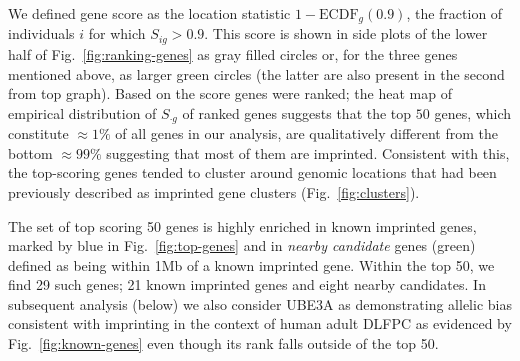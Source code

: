 \documentclass[12pt,letterpaper]{article}
\begin{document}
We defined gene score as
the location statistic \(1 - \mathrm{ECDF}_g(0.9)\), the fraction of
individuals \(i\) for which \(S_{ig}>0.9\).  This score is shown in side plots
of the lower half of Fig.~\ref{fig:ranking-genes} as gray filled circles or,
for the three genes mentioned above, as larger green circles (the latter are
also present in the second from top graph).  Based on the score genes were
ranked; the heat map of empirical distribution of \(S_{\cdot g}\) of ranked
genes suggests that the top \(50\) genes, which constitute \(\approx
1\%\) of all genes in our analysis, are qualitatively different from the
bottom \(\approx 99\%\) suggesting that most of them are imprinted.
Consistent with this, the top-scoring genes tended to cluster around genomic
locations that had been previously described as imprinted gene clusters
(Fig.~\ref{fig:clusters}).

The set of top scoring 50 genes is highly enriched in known imprinted genes,
marked by blue in Fig.~\ref{fig:top-genes} and in \emph{nearby candidate}
genes (green) defined as being within 1Mb of a known imprinted gene. Within
the top 50, we find 29 such genes; 21 known imprinted genes and eight nearby
candidates.  In subsequent analysis (below) we also consider UBE3A as
demonstrating allelic bias consistent with imprinting in the context of human
adult DLFPC as evidenced by Fig.~\ref{fig:known-genes} even though its rank
falls outside of the top 50.
\end{document}

